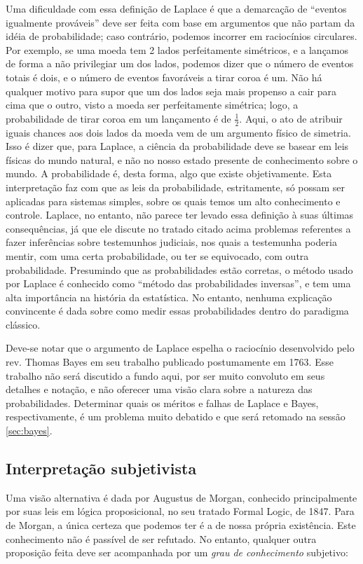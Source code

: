 \documentclass[12pt,a4paper]{article}
\begin{document}
Uma dificuldade com essa definição de Laplace é que a demarcação de ``eventos igualmente prováveis'' deve ser feita
com base em argumentos que não partam da idéia de probabilidade; caso contrário, podemos incorrer em raciocínios
circulares. Por exemplo, se uma moeda tem 2 lados perfeitamente simétricos, e a lançamos de forma a não privilegiar um dos lados,
podemos dizer que o número de eventos totais é dois, e o número de eventos favoráveis a tirar coroa é um. Não há qualquer motivo
para supor que um dos lados seja mais propenso a cair para cima que o outro, visto a moeda ser perfeitamente simétrica; logo,
a probabilidade de tirar coroa em um lançamento é de $\frac{1}{2}$. Aqui, o ato de atribuir iguais chances aos dois
lados da moeda vem de um argumento físico de simetria. Isso é dizer que, para Laplace,
a ciência da probabilidade deve se basear em leis físicas do mundo natural, e não no nosso estado presente de conhecimento 
sobre o mundo. A probabilidade é, desta forma, algo que existe objetivamente.
Esta interpretação faz com que as leis da probabilidade, estritamente, só possam ser aplicadas para 
sistemas simples, sobre os quais temos um alto conhecimento e controle. Laplace, no entanto, não parece ter levado essa 
definição à suas últimas consequências, já que ele discute no tratado citado acima problemas referentes a fazer inferências 
sobre testemunhos judiciais, nos 
quais a testemunha poderia mentir, com uma certa probabilidade, ou ter se equivocado, com outra probabilidade. 
Presumindo que as probabilidades estão corretas, o método usado por Laplace é conhecido como ``método das probabilidades
inversas'', e tem uma alta importância na história da estatística.  No entanto, 
nenhuma explicação convincente é dada sobre como medir essas probabilidades dentro do paradigma clássico.

Deve-se notar que o argumento de Laplace espelha o raciocínio desenvolvido pelo rev. Thomas Bayes em seu trabalho publicado
postumamente em 1763. Esse trabalho não será discutido a fundo aqui, por ser muito convoluto em seus detalhes e notação,
e não oferecer uma visão clara sobre a natureza das probabilidades.
Determinar quais os méritos e falhas de Laplace e Bayes, respectivamente, é um problema muito debatido e que será retomado na
sessão \ref{sec:bayes}.

\subsection{Interpretação subjetivista}
Uma visão alternativa é dada por Augustus de Morgan, conhecido principalmente por suas leis em lógica proposicional, 
no seu tratado Formal Logic, de 1847. Para de Morgan, a única certeza que podemos ter é a de nossa própria existência. 
Este conhecimento
não é passível de ser refutado. No entanto, qualquer outra proposição feita deve ser acompanhada por 
um {\em grau de conhecimento} subjetivo:
\end{document}
